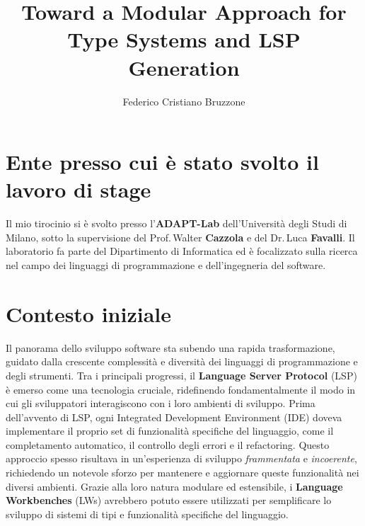 \documentclass{adapt-lab}
\begin{document}
\title{Toward a Modular Approach for Type Systems and LSP \\ Generation \\}
\author{Federico Cristiano Bruzzone}

\makefirstpage

%
%

\break

\section{Ente presso cui \`e stato svolto il lavoro di stage}

Il mio tirocinio si è svolto presso l'\textbf{ADAPT-Lab} dell'Universit\`a degli Studi di Milano, sotto la supervisione del Prof.\,Walter \textbf{Cazzola} e del Dr.\,Luca \textbf{Favalli}.
Il laboratorio fa parte del Dipartimento di Informatica ed è focalizzato sulla ricerca nel campo dei linguaggi di programmazione e dell'ingegneria del software.

\section{Contesto iniziale}

Il panorama dello sviluppo software sta subendo una rapida trasformazione, guidato dalla crescente complessità e diversità dei linguaggi di programmazione e degli strumenti. Tra i principali progressi, il \textbf{Language Server Protocol} (LSP) è emerso come una tecnologia cruciale, ridefinendo fondamentalmente il modo in cui gli sviluppatori interagiscono con i loro ambienti di sviluppo. Prima dell'avvento di LSP, ogni Integrated Development Environment (IDE) doveva implementare il proprio set di funzionalità specifiche del linguaggio, come il completamento automatico, il controllo degli errori e il refactoring. Questo approccio spesso risultava in un'esperienza di sviluppo \textit{frammentata} e \textit{incoerente}, richiedendo un notevole sforzo per mantenere e aggiornare queste funzionalità nei diversi ambienti. Grazie alla loro natura modulare ed estensibile, i \textbf{Language Workbenches} (LWs) avrebbero potuto essere utilizzati per semplificare lo sviluppo di sistemi di tipi e funzionalità specifiche del linguaggio.
\end{document}
